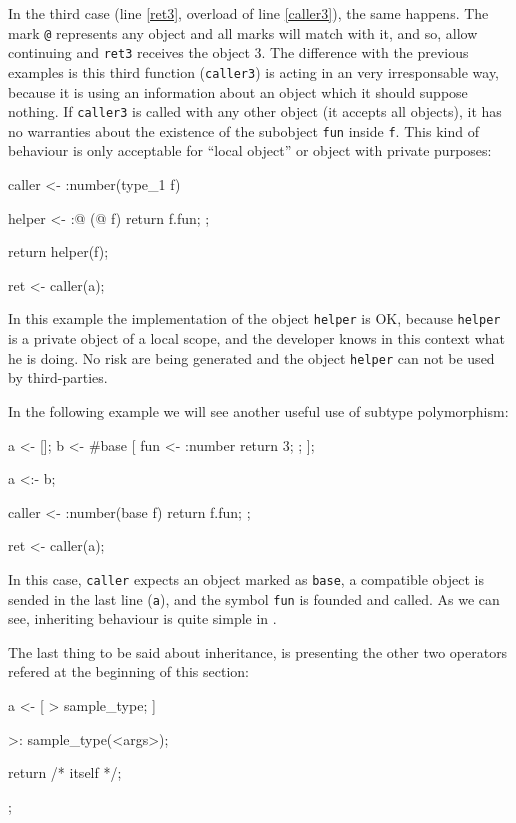 \documentclass{article}
\begin{document}
In the third case (line \ref{ret3}, overload of line \ref{caller3}), the same
happens. The mark \texttt{@} represents any object and all marks will match with
it, and so, \faupp allow continuing and \texttt{ret3} receives the object 3. The
difference with the previous examples is this third function (\texttt{caller3})
is acting in an very irresponsable way, because it is using an information about
an object which it should suppose nothing. If \texttt{caller3} is called with
any other object (it accepts all objects), it has no warranties about the
existence of the subobject \texttt{fun} inside \texttt{f}. This kind of
behaviour is only acceptable for ``local object'' or object with private
purposes:

\begin{faupp2}
  caller <- :number(type_1 f) {
              helper <- :@ (@ f)
                        { return f.fun; };

              return helper(f);
            }

  ret <- caller(a);
\end{faupp2}

In this example the implementation of the object \texttt{helper} is OK, because
\texttt{helper} is a private object of a local scope, and the developer knows in
this context what he is doing. No risk are being generated and the object
\texttt{helper} can not be used by third-parties.

In the following example we will see another useful use of subtype polymorphism:

\begin{faupp2}
  a <- [];
  b <- #base [
          fun <- :number { return 3; };
       ];

  a <:- b;

  caller <- :number(base f)
            { return f.fun; };

  ret <- caller(a);
\end{faupp2}

In this case, \texttt{caller} expects an object marked as \texttt{base}, a
compatible object is sended in the last line (\texttt{a}), and the symbol
\texttt{fun} is founded and called. As we can see, inheriting behaviour is quite
simple in \faupp.

The last thing to be said about inheritance, is presenting the other two
operators refered at the beginning of this section:

\begin{faupp2}
  a <- [
         > sample_type;
       ]
       {
          >: sample_type(<args>);

          return /* itself */;
       };

\end{faupp2}
\end{document}
